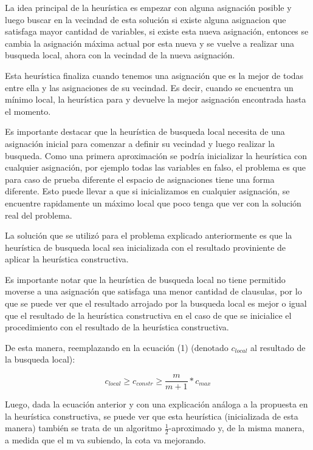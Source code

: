 \documentclass[a4paper,10pt]{article}
\begin{document}
La idea principal de la heur\'istica es empezar con alguna asignaci\'on posible y luego buscar en la vecindad de esta soluci\'on si existe alguna asignacion que satisfaga mayor cantidad de variables, si existe esta nueva asignaci\'on, entonces se cambia la asignaci\'on m\'axima actual por esta nueva y se vuelve a realizar una busqueda local, ahora con la vecindad de la nueva asignaci\'on.

Esta heur\'istica finaliza cuando tenemos una asignaci\'on que es la mejor de todas entre ella y las asignaciones de su vecindad. Es decir, cuando se encuentra un m\'inimo local, la heur\'istica para y devuelve la mejor asignaci\'on encontrada hasta el momento.

Es importante destacar que la heur\'istica de busqueda local necesita de una asignaci\'on inicial para comenzar a definir su vecindad y luego realizar la busqueda. Como una primera aproximaci\'on se podr\'ia inicializar la heur\'istica con cualquier asignaci\'on, por ejemplo todas las variables en falso, el problema es que para caso de prueba diferente el espacio de asignaciones tiene una forma diferente. Esto puede llevar a que si inicializamos en cualquier asignaci\'on, se encuentre rapidamente un m\'aximo local que poco tenga que ver con la soluci\'on real del problema. 

La soluci\'on que se utiliz\'o para el problema explicado anteriormente es que la heur\'istica de busqueda local sea inicializada con el resultado proviniente de aplicar la heur\'istica constructiva.

Es importante notar que la heur\'istica de busqueda local no tiene permitido moverse a una asignaci\'on que satisfaga una menor cantidad de clausulas, por lo que se puede ver que el resultado arrojado por la busqueda local es mejor o igual que el resultado de la heur\'istica constructiva en el caso de que se inicialice el procedimiento con el resultado de la heur\'istica constructiva.

De esta manera, reemplazando en la ecuaci\'on (1) (denotado $c_{local}$ al resultado de la busqueda local):

\begin{equation}
c_{local} \geq c_{constr} \geq \frac{m}{m+1}*c_{max}
\end{equation}

Luego, dada la ecuaci\'on anterior y con una explicaci\'on an\'aloga a la propuesta en la heur\'istica constructiva, se puede ver que esta heur\'istica (inicializada de esta manera) tambi\'en se trata de un algoritmo $\frac{1}{2}$-aproximado y, de la misma manera, a medida que el m va subiendo, la cota va mejorando.
\end{document}
